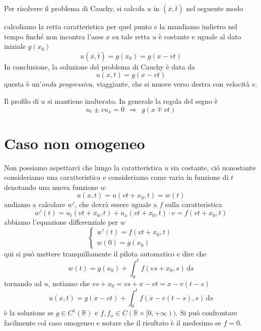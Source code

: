 \documentclass[10pt,a4paper,twoside,openright]{book}
\newcommand{\de}{\,\mathrm d}
\newcommand{\ds}{\de s}
\begin{document}
Per risolvere il problema di Cauchy, si calcola $u$ in $(\overline{x} ,\overline{t})$ nel seguente modo


calcoliamo la retta caratteristica per quel punto e la mandiamo indietro nel tempo finché non incontra l'asse $x$ su tale retta $u$ è costante e uguale al dato iniziale $g(x_{0})$
\begin{equation*}
	u(\overline{x} ,\overline{t}) =g(x_{0}) =g(x-vt)
\end{equation*}
In conclusione, la soluzione del problema di Cauchy è data da
\begin{equation}
	u(x,t) =g(x-vt)
\end{equation}
questa è un'\textit{onda progressiva}, viaggiante, che si muove verso destra con velocità $v$.


Il profilo di $u$ si mantiene inalterato. In generale la regola del segno è
\begin{equation*}
	u_{t} \pm vu_{x} =0\ \ \Rightarrow \ \ g(x\mp vt)
\end{equation*}
\section{Caso non omogeneo}
\label{sec:leggi-conservazione-non-omogeneo}

Non possiamo aspettarci che lungo la caratteristica $u$ sia costante, ciò nonostante consideriamo una caratteristica e consideriamo come varia in funzione di $t$ denotando una nuova funzione $w$
\begin{equation*}
	u(x,t) = u(vt+x_{0} ,t) =w(t)
\end{equation*}
andiamo a calcolare $w'$, che dovrà essere uguale a $f$ sulla caratteristica
\begin{equation*}
	w'(t) =u_{t}(vt+x_{0} ,t) +u_{x}(vt+x_{0} ,t) \cdotp v=f(vt+x_{0} ,t)
\end{equation*}
abbiamo l'equazione differenziale per $w$
\begin{equation*}
	\begin{cases}
		w'(t) =f(vt+x_{0} ,t) \\
		w(0) =g(x_{0})        
	\end{cases}
\end{equation*}
qui si può mettere tranquillamente il pilota automatico e dire che
\begin{equation*}
	w(t) =g(x_{0}) +\int ^{t}_{0} f(vs+x_{0} ,s) \ds
\end{equation*}
tornando ad $u$, notiamo che $vs+x_{0}=vs+x-vt=x-v(t-s)$
\begin{equation}
	u(x,t) =g(x-vt) +\int ^{t}_{0} f(x-v(t-s) ,s) \ds
\end{equation}
è la soluzione se $g\in C^{1}(\mathbb{R})$ e $f,f_{x} \in C(\mathbb{R} \times [ 0,+\infty))$. Si può confrontare facilmente col caso omogeneo e notare che il risultato è il medesimo se $f=0$.
\end{document}

